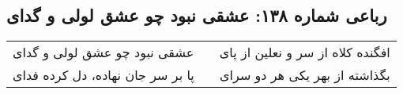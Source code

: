 \begin{center}
\section*{رباعی شماره ۱۳۸: عشقی نبود چو عشق لولی و گدای}
\label{sec:138}
\begin{longtable}{l p{0.5cm} r}
عشقی نبود چو عشق لولی و گدای
&&
افگنده کلاه از سر و نعلین از پای
\\
پا بر سر جان نهاده، دل کرده فدای
&&
بگذاشته از بهر یکی هر دو سرای
\\
\end{longtable}
\end{center}
